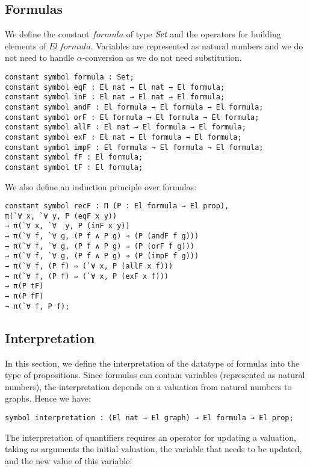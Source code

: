 \documentclass[submission,copyright,creativecommons]{eptcs}
\def\Set{\mbox{\it Set}}
\begin{document}
\subsection{Formulas}

We define the constant $formula$ of type $\Set$ and the operators for building elements of $El~formula$. Variables are represented as natural numbers and we do not need to handle $\alpha$-conversion as we do not need substitution.

\begin{lstlisting}
constant symbol formula : Set;
constant symbol eqF : El nat → El nat → El formula;
constant symbol inF : El nat → El nat → El formula;
constant symbol andF : El formula → El formula → El formula;
constant symbol orF : El formula → El formula → El formula;
constant symbol allF : El nat → El formula → El formula;
constant symbol exF : El nat → El formula → El formula;
constant symbol impF : El formula → El formula → El formula;
constant symbol fF : El formula;
constant symbol tF : El formula;
\end{lstlisting}

We also define an induction principle over formulas:

\begin{lstlisting}
constant symbol recF : Π (P : El formula → El prop), 
π(`∀ x, `∀ y, P (eqF x y))
→ π(`∀ x, `∀  y, P (inF x y))
→ π(`∀ f, `∀ g, (P f ∧ P g) ⇒ (P (andF f g)))
→ π(`∀ f, `∀ g, (P f ∧ P g) ⇒ (P (orF f g)))
→ π(`∀ f, `∀ g, (P f ∧ P g) ⇒ (P (impF f g)))
→ π(`∀ f, (P f) ⇒ (`∀ x, P (allF x f)))
→ π(`∀ f, (P f) ⇒ (`∀ x, P (exF x f)))
→ π(P tF)
→ π(P fF)
→ π(`∀ f, P f);
\end{lstlisting}

\subsection{Interpretation}

In this section, we define the interpretation of the datatype of formulas into the type of propositions. Since formulas can contain variables (represented as natural numbers), the interpretation depends on a valuation from natural numbers to graphs. Hence we have:

\begin{lstlisting}
symbol interpretation : (El nat → El graph) → El formula → El prop;
\end{lstlisting} 

The interpretation of quantifiers requires an operator for updating a valuation, taking as arguments the initial valuation, the variable that needs to be updated, and the new value of this variable:
\end{document}
